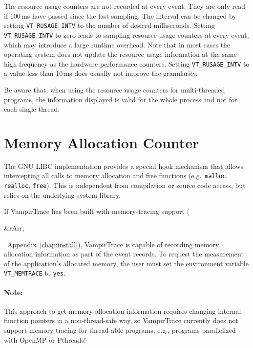 \documentclass[a4paper,twoside,12pt,BCOR12mm]{scrbook}
\newcommand{\rarr}{$\Rightarrow$}  %
\renewcommand{\rarr}{\begin{rawhtml}&rArr;\end{rawhtml}}   %
\begin{document}
  The resource usage counters are not recorded at every event.
  They are only read if 100\,ms have passed since the last sampling.
  The interval can be changed by setting \texttt{VT\_RUSAGE\_INTV}
  to the number of desired milliseconds.
  Setting \texttt{VT\_RUSAGE\_INTV} to zero leads to sampling resource
  usage counters at every event, which may introduce a large runtime overhead.
  Note that in most cases the operating system does not update the resource usage information 
  at the same high frequency as the hardware performance counters.
  Setting \texttt{VT\_RUSAGE\_INTV} to a value less than 10\,ms does usually not
  improve the granularity.
  
  Be aware that, when using the resource usage counters for multi-threaded programs,
  the information displayed is valid for the whole process and not for each single thread.

\section{Memory Allocation Counter}
\label{sec:mem_alloc_counter}

  The GNU LIBC implementation provides a special hook mechanism that allows
  intercepting all calls to memory allocation and free functions
  (e.g.~\texttt{malloc},\latex{\linebreak} \texttt{realloc}, \texttt{free}).
  This is independent from compilation or source code access, but relies on the
  underlying system library.

  If VampirTrace has been built with memory-tracing support (\rarr\ 
  Appendix~\ref{chap:install}), VampirTrace is capable of recording memory allocation
  information as part of the event records. To request the measurement of
  the application's allocated memory, the user must set the environment variable
  \texttt{VT\_MEMTRACE} to \texttt{yes}.

  \paragraph{Note:}
  This approach to get memory allocation information requires changing internal
  function pointers in a non-thread-safe way, so VampirTrace currently does not support
  memory tracing for thread-able programs, e.g., programs parallelized with OpenMP or Pthreads!
\end{document}
